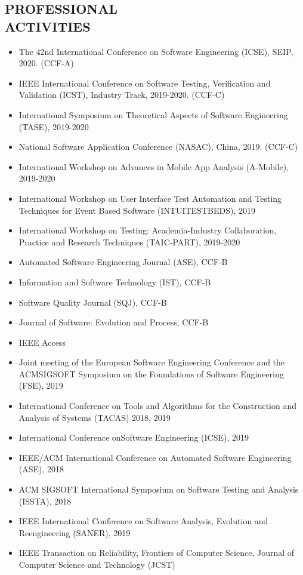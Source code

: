 \documentclass[margin]{res}
\begin{document}
\begin{resume}
\section{PROFESSIONAL\\ACTIVITIES}
\begin{itemize}[leftmargin=*]
	\item The 42nd International Conference on Software Engineering (ICSE), SEIP, 2020. (CCF-A)
    \item IEEE International Conference on Software Testing, Verification and Validation (ICST), Industry Track, 2019-2020. (CCF-C)
    \item International Symposium on Theoretical Aspects of Software Engineering (TASE), 2019-2020
    \item National Software Application Conference (NASAC), China, 2019. (CCF-C)
    \item International Workshop on Advances in Mobile App Analysis (A-Mobile), 2019-2020
    \item International Workshop on User Interface Test Automation and Testing Techniques for Event Based Software (INTUITESTBEDS), 2019
    \item International Workshop on Testing: Academia-Industry Collaboration, Practice and Research Techniques (TAIC-PART), 2019-2020
\end{itemize}
\begin{itemize}[leftmargin=*]
	\item Automated Software Engineering Journal (ASE), CCF-B
    \item Information and Software Technology (IST), CCF-B
    \item Software Quality Journal (SQJ), CCF-B
    \item Journal of Software: Evolution and Process, CCF-B
    \item IEEE Access
\end{itemize}
\begin{itemize}[leftmargin=*]
    \item Joint meeting of the European Software Engineering Conference and the ACMSIGSOFT Symposium on the Foundations of Software Engineering (FSE), 2019
    \item International Conference on Tools and Algorithms for the Construction and Analysis of Systems (TACAS) 2018, 2019
    \item International Conference onSoftware Engineering (ICSE), 2019
    \item IEEE/ACM  International  Conference  on  Automated  Software  Engineering (ASE), 2018
    \item ACM SIGSOFT International Symposium on Software Testing and Analysis (ISSTA), 2018
    \item IEEE International Conference on Software Analysis, Evolution and Reengineering (SANER), 2019
    \item IEEE Transaction on Reliability, Frontiers of Computer Science, Journal of Computer Science and Technology (JCST)
\end{itemize}


\end{resume}
\end{document}
